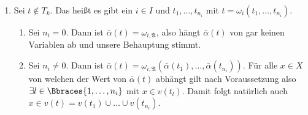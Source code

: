 \begin{solution}
\begin{enumerate}[label = \arabic*.]
\begin{enumerate}[label = Fall \arabic*:]
            \item Sei $t \notin T_k$. Das heißt es gibt ein $i \in I$ und $t_1, \dots, t_{n_i}$ mit $t = \omega_i(t_1, \dots, t_{n_i})$. 
            \begin{enumerate}[label = Fall 2.\arabic*:]
                \item Sei $n_i = 0$. Dann ist $\bar{\alpha}(t) = \omega_{i, \mathfrak{A}}$, also hängt $\bar{\alpha}(t)$ von gar keinen Variablen ab und unsere Behauptung stimmt.
                \item Sei $n_i \neq 0$. Dann ist $\bar{\alpha}(t) = \omega_{i, \mathfrak{A}}(\bar{\alpha}(t_1), \dots, \bar{\alpha}(t_{n_i}))$. Für alle $x \in X$ von welchen der Wert von $\bar{\alpha}(t)$ abhängt gilt nach Voraussetzung also $\exists l \in \Bbraces{1, \dots, n_i}$ mit $x \in v(t_l)$. Damit folgt natürlich auch $x \in v(t) = v(t_1) \cup \dots \cup v(t_{n_i})$.
            \end{enumerate} 
        \end{enumerate}
    \end{enumerate}
\end{solution}